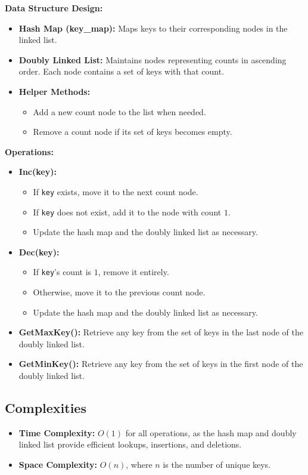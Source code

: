 \textbf{Data Structure Design:}
\begin{itemize}
    \item \textbf{Hash Map (key\_map):} Maps keys to their corresponding nodes in the linked list.
    \item \textbf{Doubly Linked List:} Maintains nodes representing counts in ascending order. Each node contains a set of keys with that count.
    \item \textbf{Helper Methods:}
    \begin{itemize}
        \item Add a new count node to the list when needed.
        \item Remove a count node if its set of keys becomes empty.
    \end{itemize}
\end{itemize}

\textbf{Operations:}
\begin{itemize}
    \item \textbf{Inc(key):}
    \begin{itemize}
        \item If \texttt{key} exists, move it to the next count node.
        \item If \texttt{key} does not exist, add it to the node with count \(1\).
        \item Update the hash map and the doubly linked list as necessary.
    \end{itemize}
    \item \textbf{Dec(key):}
    \begin{itemize}
        \item If \texttt{key}'s count is \(1\), remove it entirely.
        \item Otherwise, move it to the previous count node.
        \item Update the hash map and the doubly linked list as necessary.
    \end{itemize}
    \item \textbf{GetMaxKey():} Retrieve any key from the set of keys in the last node of the doubly linked list.
    \item \textbf{GetMinKey():} Retrieve any key from the set of keys in the first node of the doubly linked list.
\end{itemize}

\subsection*{Complexities}
\begin{itemize}
    \item \textbf{Time Complexity:} \(O(1)\) for all operations, as the hash map and doubly linked list provide efficient lookups, insertions, and deletions.
    \item \textbf{Space Complexity:} \(O(n)\), where \(n\) is the number of unique keys.
\end{itemize}

